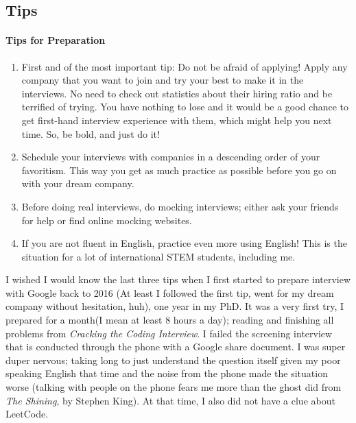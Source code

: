 \documentclass[../main.tex]{subfiles}
\begin{document}
\subsection{Tips}
\paragraph{Tips for Preparation}
\begin{enumerate}
    \item First and of the most important tip: Do not be afraid of applying! Apply any company that you want to join and try your best to make it in the interviews. No need to check out statistics about their hiring ratio and be terrified of trying. You have nothing to lose and it would be a good chance to get first-hand interview experience with them, which might help you next time. So, be bold, and just do it! 
    \item Schedule your interviews with companies in a descending order of your favoritism. This way you get as much practice as possible before you go on with your dream company.
    \item Before doing real interviews, do mocking interviews; either ask your friends for help or find online mocking websites.
    \item If you are not fluent in English, practice even more using English! This is the situation for a lot of international STEM students, including me.
\end{enumerate}
I wished I would know the last three tips when I first started to prepare interview with Google back to 2016 (At least I followed the first tip, went for my dream company without hesitation, huh), one year in my PhD. It was a very first try, I prepared for a month(I mean at least 8 hours a day); reading and finishing all problems from \textit{Cracking the Coding Interview}. I failed the screening interview that is conducted through the phone with a Google share document. I was super duper nervous; taking long to just understand the question itself given my poor speaking English that time and the noise from the phone made the situation worse (talking with people on the phone fears me more than the ghost did from \textit{The Shining}, by Stephen King). At that time, I also did not have a clue about LeetCode. 
\end{document}
